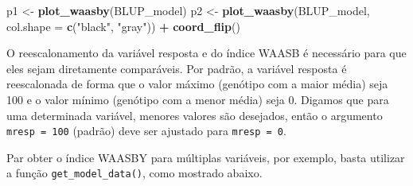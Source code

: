 \documentclass[
]{book}
\newenvironment{Shaded}{\begin{snugshade}}{\end{snugshade}}
\newcommand{\DataTypeTok}[1]{\textcolor[rgb]{0.13,0.29,0.53}{#1}}
\newcommand{\KeywordTok}[1]{\textcolor[rgb]{0.13,0.29,0.53}{\textbf{#1}}}
\newcommand{\NormalTok}[1]{#1}
\newcommand{\OperatorTok}[1]{\textcolor[rgb]{0.81,0.36,0.00}{\textbf{#1}}}
\newcommand{\StringTok}[1]{\textcolor[rgb]{0.31,0.60,0.02}{#1}}
\begin{document}
\begin{Shaded}
\begin{Highlighting}[]
\NormalTok{p1 <-}\StringTok{ }\KeywordTok{plot_waasby}\NormalTok{(BLUP_model)}
\NormalTok{p2 <-}\StringTok{ }\KeywordTok{plot_waasby}\NormalTok{(BLUP_model,}
                  \DataTypeTok{col.shape =} \KeywordTok{c}\NormalTok{(}\StringTok{"black"}\NormalTok{, }\StringTok{"gray"}\NormalTok{)) }\OperatorTok{+}
\StringTok{  }\KeywordTok{coord_flip}\NormalTok{()}
\end{Highlighting}
\end{Shaded}

\begin{dica}
O reescalonamento da variável resposta e do índice WAASB é necessário para que eles sejam diretamente comparáveis. Por padrão, a variável resposta é reescalonada de forma que o valor máximo (genótipo com a maior média) seja 100 e o valor mínimo (genótipo com a menor média) seja 0. Digamos que para uma determinada variável, menores valores são desejados, então o argumento \texttt{mresp\ =\ 100} (padrão) deve ser ajustado para \texttt{mresp\ =\ 0}.
\end{dica}

Par obter o índice WAASBY para múltiplas variáveis, por exemplo, basta utilizar a função \texttt{get\_model\_data()}, como mostrado abaixo.
\end{document}
